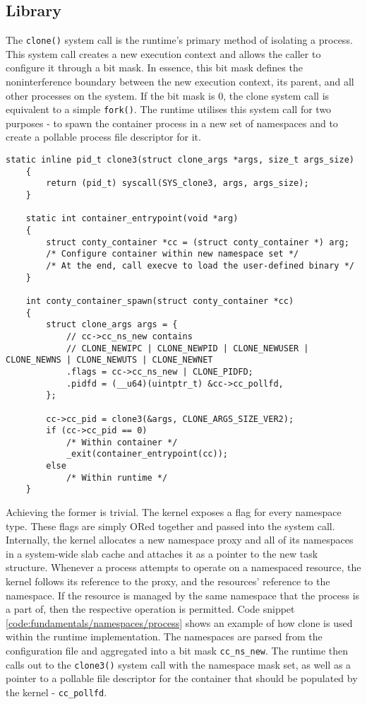 \subsection{Library}
\label{ch:implementation/runtime/library}
The \verb|clone()| system call is the runtime's primary method of isolating a process.
This system call creates a new execution context and allows the caller to configure it 
through a bit mask. In essence, this bit mask defines the noninterference boundary between 
the new execution context, its parent, and all other processes on the system. If the bit mask is 0, 
the clone system call is equivalent to a simple \verb|fork()|. The runtime utilises this 
system call for two purposes - to spawn the container process in a new set of namespaces and to 
create a pollable process file descriptor for it. 
\begin{lstlisting}[style=c-code-snippets, label={code:implementation/namespaces/clone}, caption={Container instantiation within the runtime using clone3}]
    static inline pid_t clone3(struct clone_args *args, size_t args_size)
    {
        return (pid_t) syscall(SYS_clone3, args, args_size);
    }
    
    static int container_entrypoint(void *arg)
    {
        struct conty_container *cc = (struct conty_container *) arg;
        /* Configure container within new namespace set */
        /* At the end, call execve to load the user-defined binary */
    }
    
    int conty_container_spawn(struct conty_container *cc)
    {
        struct clone_args args = {
            // cc->cc_ns_new contains
            // CLONE_NEWIPC | CLONE_NEWPID | CLONE_NEWUSER | CLONE_NEWNS | CLONE_NEWUTS | CLONE_NEWNET
            .flags = cc->cc_ns_new | CLONE_PIDFD;
            .pidfd = (__u64)(uintptr_t) &cc->cc_pollfd,
        };
    
        cc->cc_pid = clone3(&args, CLONE_ARGS_SIZE_VER2);
        if (cc->cc_pid == 0) 
            /* Within container */
            _exit(container_entrypoint(cc));
        else 
            /* Within runtime */
    }
    \end{lstlisting}
    
Achieving the former is trivial. The kernel exposes a flag for every namespace type.
These flags are simply ORed together and passed into the system call. 
Internally, the kernel allocates a new namespace proxy and all of its namespaces 
in a system-wide slab cache and attaches it as a pointer to the new task structure.
Whenever a process attempts to operate on a namespaced resource, the kernel follows its reference to the 
proxy, and the resources' reference to the namespace. If the resource is managed by the same namespace 
that the process is a part of, then the respective operation is permitted.
Code snippet \ref{code:fundamentals/namespaces/process} shows an example of how clone is used 
within the runtime implementation. The namespaces are parsed from the configuration file and 
aggregated into a bit mask \verb|cc_ns_new|. The runtime then calls out to the \verb|clone3()| system call
with the namespace mask set, as well as a pointer to a pollable file descriptor for the 
container that should be populated by the kernel - \verb|cc_pollfd|. 

